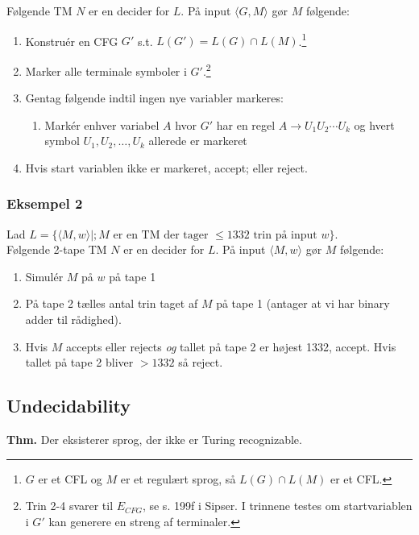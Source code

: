 Følgende TM $N$ er en decider for $L$. På input $\langle G,M \rangle$ gør $M$ følgende:
\begin{enumerate}
	\item Konstruér en CFG $G'$ s.t. $L(G')=L(G) \cap L(M)$.\footnote{$G$ er et CFL og $M$ er et regulært sprog, så $L(G) \cap L(M)$ er et CFL.}
	\item Marker alle terminale symboler i $G'$.\footnote{Trin 2-4 svarer til $E_{CFG}$, se s. 199f i Sipser. I trinnene testes om startvariablen i $G'$ kan generere en streng af terminaler.}
	\item Gentag følgende indtil ingen nye variabler markeres:
	\begin{enumerate}
		\item Markér enhver variabel $A$ hvor $G'$ har en regel $A \rightarrow U_1 U_2 \cdots U_k$ og hvert symbol $U_1,U_2,\ldots,U_k$ allerede er markeret
	\end{enumerate}
	\item Hvis start variablen ikke er markeret, accept; eller reject. 
\end{enumerate} 

\subsubsection*{Eksempel 2}

Lad $L=\{\langle M, w \rangle |; M \text{ er en TM der tager } \le 1332 \text{ trin på input } w\}$.\\

Følgende 2-tape TM $N$ er en decider for $L$. På input $\langle M,w \rangle$ gør $M$ følgende: 
\begin{enumerate}
	\item Simulér $M$ på $w$ på tape 1 
	\item På tape 2 tælles antal trin taget af $M$ på tape 1 (antager at vi har binary adder til rådighed).
	\item Hvis $M$ accepts eller rejects \textit{og} tallet på tape 2 er højest 1332, accept. Hvis tallet på tape 2 bliver $>1332$ så reject.   
\end{enumerate} 

\subsection*{Undecidability}

\textbf{Thm.} Der eksisterer sprog, der ikke er Turing recognizable. \\

